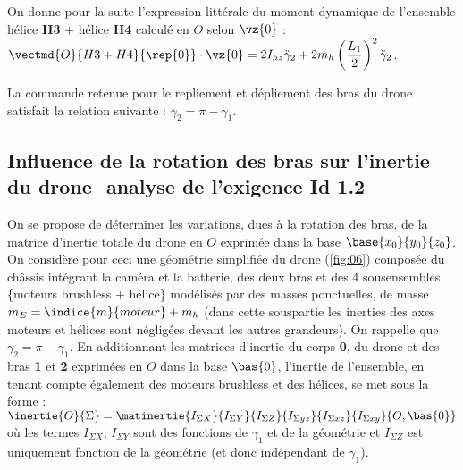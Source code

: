 \ifprof
\begin{corrige}
\end{corrige}
\else
\fi


On donne pour la suite l’expression littérale du moment dynamique de l’ensemble hélice \textbf{H3}
+ hélice \textbf{H4} calculé en $O$ selon $\vz{0}$ : $\vectmd{O}{H3+H4}{\rep{0}} \cdot \vz{0} = 2 I_{hz} \ddot{\gamma}_2 + 2m_h \left(\dfrac{L_1}{2}\right)^2 \ddot{\gamma}_2$.

\ifprof
\begin{corrige}

\end{corrige}
\else
\fi

La commande retenue pour le repliement et dépliement des bras du drone satisfait la relation
suivante : $\gamma_2 = \pi - \gamma_1$.


\ifprof
\begin{corrige}
\end{corrige}
\else
\fi



\subsection{Influence de la rotation des bras sur l’inertie du drone ­ analyse de l’exigence Id 1.2}
On se propose de déterminer les variations, dues à la rotation des bras, de la matrice d’inertie
totale du drone en $O$ exprimée dans la base $\base{x_0}{y_0}{z_0}$. On considère pour ceci une géométrie
simplifiée du drone (\autoref{fig:06}) composée du châssis intégrant la caméra et la batterie, des
deux bras et des 4 sous­ensembles \{moteurs brushless + hélice\} modélisés par des masses
ponctuelles, de masse $m_E = \indice{m}{moteur}+m_h$ (dans cette sous­partie les inerties des axes moteurs
et hélices sont négligées devant les autres grandeurs). On rappelle que $\gamma_2 = \pi - \gamma_1$.
En additionnant les matrices d’inertie du corps \textbf{0}, du drone et des bras \textbf{1} et \textbf{2} exprimées en $O$
dans la base $\bas{0}$, l’inertie de l’ensemble, en tenant compte également des moteurs brushless
et des hélices, se met sous la forme : $\inertie{O}{\Sigma} = \matinertie{I_{\Sigma X}}{I_{\Sigma Y}}{I_{\Sigma Z}}{I_{\Sigma yz}}{I_{\Sigma xz}}{I_{\Sigma xy}}{O,\bas{0}}$
où les termes $I_{\Sigma X}$, $I_{\Sigma Y}$ sont des fonctions de $\gamma_1$ et de la géométrie et $I_{\Sigma Z}$ est uniquement
fonction de la géométrie (et donc indépendant de $\gamma_1$).

